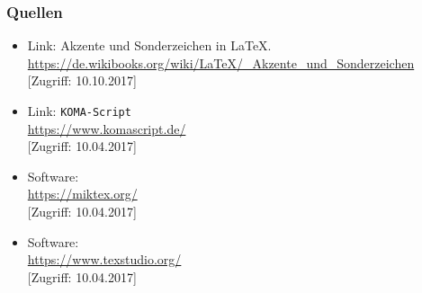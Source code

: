 \documentclass[a4paper,10pt,handout]{beamer}
\begin{document}
\begin{frame}[allowframebreaks]
\frametitle{Quellen}

{\footnotesize
	
	\begin{itemize}

		
		\item Link: Akzente und Sonderzeichen in \LaTeX .\\
		\url{https://de.wikibooks.org/wiki/LaTeX/_Akzente_und_Sonderzeichen}\\
		{[}Zugriff: 10.10.2017]

		\item Link: \texttt{KOMA-Script}\\
		\url{https://www.komascript.de/}\\
		{[}Zugriff: 10.04.2017]

		\item Software: \\
		\url{https://miktex.org/} \\
		{[}Zugriff: 10.04.2017]
		
		\item Software: \\
		\url{https://www.texstudio.org/} \\
		{[}Zugriff: 10.04.2017]
		
%		
%		
%		
%		
		
	\end{itemize}
}

\end{frame}
\end{document}

